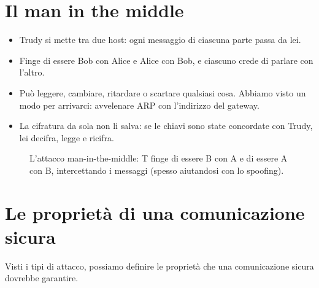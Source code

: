 \section{Il man in the middle}

\begin{itemize}
    \item Trudy si mette tra due host: ogni messaggio di ciascuna parte passa da lei.
    \item Finge di essere Bob con Alice e Alice con Bob, e ciascuno crede di parlare con l'altro.
    \item Può leggere, cambiare, ritardare o scartare qualsiasi cosa. Abbiamo visto un modo per arrivarci: avvelenare ARP con
          l'indirizzo del gateway.
    \item La cifratura da sola non li salva: se le chiavi sono state concordate con Trudy, lei decifra, legge e ricifra.
\end{itemize}

\begin{figure}[H]
\centering
{}
\caption{L'attacco man-in-the-middle: T finge di essere B con A e di essere A con B, intercettando i messaggi (spesso aiutandosi con lo spoofing).}
\end{figure}

\section{Le proprietà di una comunicazione sicura}

Visti i tipi di attacco, possiamo definire le proprietà che una comunicazione sicura dovrebbe garantire.

